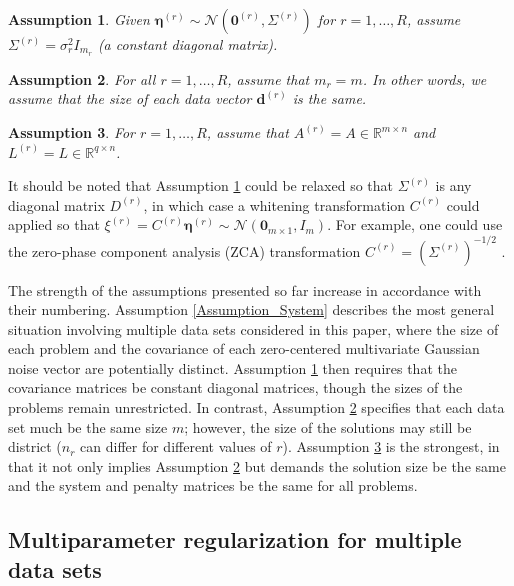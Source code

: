 \documentclass[12pt]{article}
\newcommand{\mA}{m}	%
\newcommand{\mL}{q}	%
\newcommand{\dVec}{\mathbf{d}}	%
\newcommand{\noise}{\eta}	%
\newcommand{\noiseSD}{\sigma}	%
\newcommand{\noiseVec}{\bm{\noise}}	%
\newcommand{\zeroVec}{\bm{0}}	%
\newtheorem{assumption}{Assumption}
\begin{document}
\begin{assumption}
\label{Assumption_Noise}
Given $\noiseVec^{(r)} \sim \mathcal{N}(\zeroVec^{(r)},\Sigma^{(r)})$ for $r = 1,\ldots,R$, assume $\Sigma^{(r)} = \noiseSD_r^2 I_{m_r}$ (a constant diagonal matrix).
\end{assumption}

\begin{assumption}
\label{Assumption_Rows}
For all $r = 1,\ldots,R$, assume that $m_r = m$. In other words, we assume that the size of each data vector $\dVec^{(r)}$ is the same.
\end{assumption} 

\begin{assumption}
\label{Assumption_Matrices}
For $r = 1,\ldots,R$, assume that $A^{(r)} = A \in \mathbb{R}^{\mA \times n}$ and $L^{(r)} = L \in \mathbb{R}^{\mL \times n}$.
\end{assumption}  

\noindent It should be noted that Assumption \ref{Assumption_Noise} could be relaxed so that $\Sigma^{(r)}$ is any diagonal matrix $D^{(r)}$, in which case a whitening transformation $C^{(r)}$ could applied so that $\xi^{(r)} = C^{(r)}\noiseVec^{(r)} \sim \mathcal{N}(\zeroVec_{\mA \times 1},I_{\mA})$. For example, one could use the zero-phase component analysis (ZCA) transformation $C^{(r)} = \left(\Sigma^{(r)}\right)^{-1/2}$ \cite{BellSejnowski}. \par
The strength of the assumptions presented so far increase in accordance with their numbering. Assumption \ref{Assumption_System} describes the most general situation involving multiple data sets considered in this paper, where the size of each problem and the covariance of each zero-centered multivariate Gaussian noise vector are potentially distinct. Assumption \ref{Assumption_Noise} then requires that the covariance matrices be constant diagonal matrices, though the sizes of the problems remain unrestricted. In contrast, Assumption \ref{Assumption_Rows} specifies that each data set much be the same size $m$; however, the size of the solutions may still be district ($n_r$ can differ for different values of $r$). Assumption \ref{Assumption_Matrices} is the strongest, in that it not only implies Assumption \ref{Assumption_Rows} but demands the solution size be the same and the system and penalty matrices be the same for all problems.

\subsection{Multiparameter regularization for multiple data sets} \label{sec:Adapted regularization}
\end{document}
